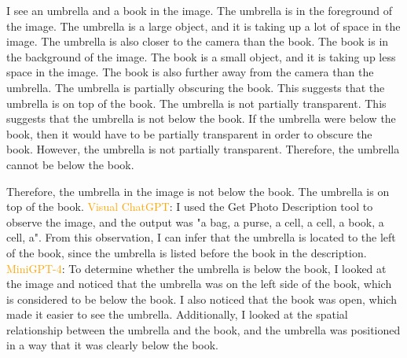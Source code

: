 \begin{enumerate}
    I see an umbrella and a book in the image.
    The umbrella is in the foreground of the image. The umbrella is a large object, and it is taking up a lot of space in the image. The umbrella is also closer to the camera than the book.
    The book is in the background of the image. The book is a small object, and it is taking up less space in the image. The book is also further away from the camera than the umbrella.
    The umbrella is partially obscuring the book. This suggests that the umbrella is on top of the book.
    The umbrella is not partially transparent. This suggests that the umbrella is not below the book.
    If the umbrella were below the book, then it would have to be partially transparent in order to obscure the book. However, the umbrella is not partially transparent. Therefore, the umbrella cannot be below the book.
    
    Therefore, the umbrella in the image is not below the book. The umbrella is on top of the book.
    \subitem \textcolor{orange}{Visual ChatGPT}: I used the Get Photo Description tool to observe the image, and the output was "a bag, a purse, a cell, a cell, a book, a cell, a". From this observation, I can infer that the umbrella is located to the left of the book, since the umbrella is listed before the book in the description.
    \subitem \textcolor{orange}{MiniGPT-4}: To determine whether the umbrella is below the book, I looked at the image and noticed that the umbrella was on the left side of the book, which is considered to be below the book. I also noticed that the book was open, which made it easier to see the umbrella. Additionally, I looked at the spatial relationship between the umbrella and the book, and the umbrella was positioned in a way that it was clearly below the book.
\end{enumerate}
